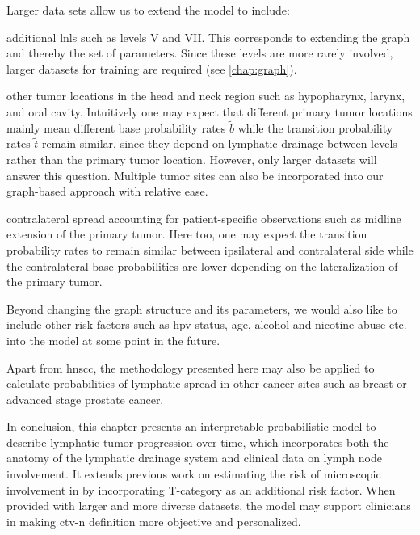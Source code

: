 \documentclass[\relativeRoot/main.tex]{subfiles}
\begin{document}
Larger data sets allow us to extend the model to include:
\begin{enumerate*}[label={(\arabic*)}]
    \item additional \glspl{lnl} such as levels V and VII. This corresponds to extending the graph and thereby the set of parameters. Since these levels are more rarely involved, larger datasets for training are required (see \cref{chap:graph}).
    \item other tumor locations in the head and neck region such as hypopharynx, larynx, and oral cavity. Intuitively one may expect that different primary tumor locations mainly mean different base probability rates $\tilde{b}$ while the transition probability rates $\tilde{t}$ remain similar, since they depend on lymphatic drainage between levels rather than the primary tumor location. However, only larger datasets will answer this question. Multiple tumor sites can also be incorporated into our graph-based approach with relative ease.
    \item contralateral spread accounting for patient-specific observations such as midline extension of the primary tumor. Here too, one may expect the transition probability rates to remain similar between ipsilateral and contralateral side while the contralateral base probabilities are lower depending on the lateralization of the primary tumor.
    \item Beyond changing the graph structure and its parameters, we would also like to include other risk factors such as \gls{hpv} status, age, alcohol and nicotine abuse etc. into the model at some point in the future.
    \item Apart from \gls{hnscc}, the methodology presented here may also be applied to calculate probabilities of lymphatic spread in other cancer sites such as breast or advanced stage prostate cancer.
\end{enumerate*}

In conclusion, this chapter presents an interpretable probabilistic model to describe lymphatic tumor progression over time, which incorporates both the anatomy of the lymphatic drainage system and clinical data on lymph node involvement. It extends previous work on estimating the risk of microscopic involvement in  by incorporating T-category as an additional risk factor. When provided with larger and more diverse datasets, the model may support clinicians in making \gls{ctv-n} definition more objective and personalized.
\end{document}
